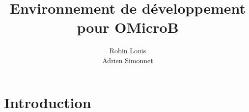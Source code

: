 \documentclass[12pt,a4paper]{report}
\author{Robin Louis\\Adrien Simonnet}
\title{Environnement de développement pour OMicroB}
\begin{document}

\chapter{Introduction}

\end{document}
